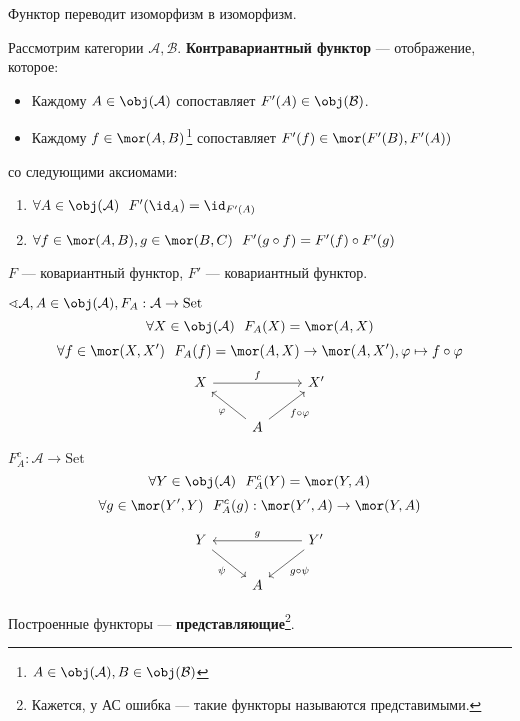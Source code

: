 \begin{lemma}
    Функтор переводит изоморфизм в изоморфизм.
\end{lemma}

\begin{definition}
    Рассмотрим категории \(\mathcal{A}, \mathcal{B}\). \textbf{Контравариантный функтор} --- отображение, которое:
    \begin{itemize}
        \item Каждому \(A \in \obj(\mathcal{A})\) сопоставляет \(F'(A) \in \obj(\mathcal{B})\).
        \item Каждому \(f \in \mor(A, B)\)\footnote{\(A \in \obj(\mathcal{A}), B \in \obj(\mathcal{B})\)} сопоставляет \(F'(f) \in \mor(F'(B), F'(A))\)
    \end{itemize}
    со следующими аксиомами:
    \begin{enumerate}
        \item \(\forall A \in \obj(\mathcal{A}) \ \ F'(\id_A) = \id_{F'(A)}\)
        \item \(\forall f \in \mor(A, B), g \in \mor(B, C) \ \ F'(g \circ f) = F'(f) \circ F'(g)\)
    \end{enumerate}
\end{definition}

\begin{obozn}
    \(F\) --- ковариантный функтор, \(F'\) --- ковариантный функтор.
\end{obozn}

\(\sphericalangle \mathcal{A}, A \in \obj(\mathcal{A}), F_A : \mathcal{A} \to \mathrm{Set}\)
\[\forall X \in \obj(\mathcal{A}) \ \ F_A(X) = \mor(A, X)\]
\[\forall f \in \mor(X, X') \ \ F_A(f) = \mor (A, X) \to \mor(A, X'), \varphi \mapsto f \circ \varphi\]
\[\begin{tikzcd}
        X \arrow{rr}{f} & & X' \\
        & A \arrow{ul}{\varphi} \arrow[swap]{ur}{f \circ \varphi} &
    \end{tikzcd}\]

\(F_A^c : \mathcal{A} \to \mathrm{Set}\)
\[\forall Y \in \obj(\mathcal{A}) \ \ F_A^c(Y) = \mor(Y, A)\]
\[\forall g \in \mor(Y', Y) \ \ F_A^c(g) : \mor(Y', A) \to \mor(Y, A)\]

\[\begin{tikzcd}
        Y \arrow[swap]{dr}{\psi} & & Y' \arrow[swap]{ll}{g} \arrow{dl}{g \circ \psi} \\
        & A &
    \end{tikzcd}\]

Построенные функторы --- \textbf{представляющие}\footnote{Кажется, у АС ошибка --- такие функторы называются представимыми.}.
